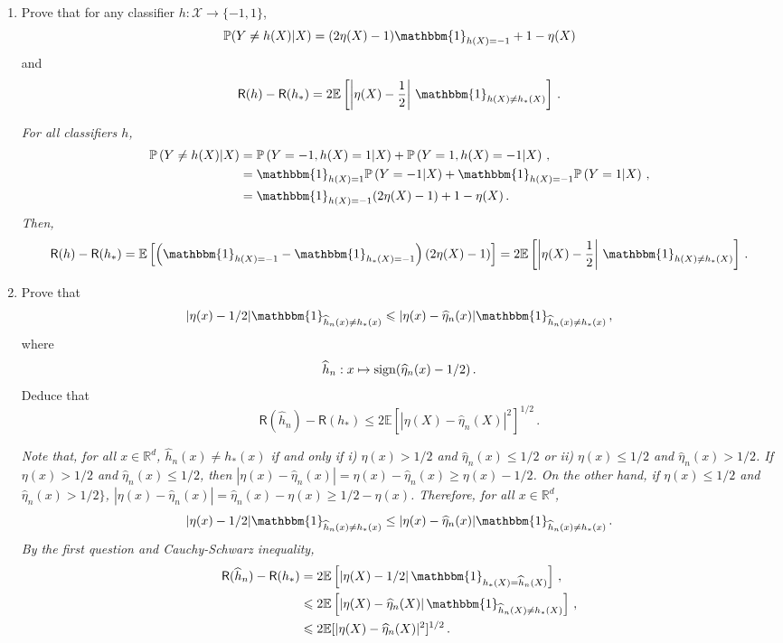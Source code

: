 \documentclass[a4paper,10pt,fleqn]{article}
\newcommand{\eqsp}{\,}
\newcommand{\bP}{\mathbb{P}}
\newcommand{\1}{\ensuremath{\mathbbm{1}}}
\newcommand{\bE}{\mathbb{E}}
\begin{document}
\begin{enumerate}
\item Prove that for any classifier $h:\mathcal{X}\to \{-1,1\}$,
$$
\bP(Y\neq h(X)|X) = (2\eta(X)-1)\1_{h(X)=-1}+1-\eta(X)
$$
and
$$
\mathsf{R}(h)-\mathsf{R}(h_{*})=2\bE \left[\left|\eta(X)-\frac{1}{2}\right|\eqsp\1_{h(X)\neq h_*(X)}\right]\eqsp.
$$

\vspace{.2cm}

{\em
For all classifiers $h$,
\begin{align*}
\bP\left(Y \neq h(X) | X\right)& = \bP\left(Y=-1, h(X) = 1 |X\right) + \bP\left(Y=1, h(X) = -1 |X\right)\eqsp,\\
& = \1_{h(X) = 1} \bP\left(Y=-1 |X\right) + \1_{h(X) = -1} \bP\left(Y=1 |X\right)\eqsp,\\
& = \1_{h(X) = -1} (2\eta(X) - 1) + 1 - \eta(X)\eqsp.
\end{align*}
Then,
$$
\mathsf{R}(h)-\mathsf{R}(h_{*})=\bE \left[\left(\1_{h(X) = -1}-\1_{h_*(X) = -1}\right) (2\eta(X) - 1) \right] =  2\bE \left[\left|\eta(X)-\frac{1}{2}\right|\eqsp\1_{h(X)\neq h_*(X)}\right]\eqsp.
$$
}
\item Prove that 
$$
|\eta(x)-1/2|\1_{\widehat h_n(x)\neq h_{*}(x)}\leqslant |\eta(x)-\widehat \eta_n(x)|\1_{\widehat h_n(x)\neq h_{*}(x)}\eqsp,
$$
where
$$
\widehat h_n:x \mapsto{\rm sign}(\widehat \eta_n(x)-1/2)\eqsp.
$$
Deduce that 
$$
\mathsf{R}(\widehat h_n)-\mathsf{R}(h_*)\leqslant  2 \bE[|\eta(X) - \widehat \eta_n(X)|^2]^{1/2}\eqsp.
$$

\vspace{.2cm}

{\em
Note that, for all $x\in\mathbb{R}^d$, $\widehat h_n(x) \neq h_*(x)$ if and only if i) $\eta(x) > 1/2$ and $\widehat\eta_n(x) \leqslant 1/2$ or ii) $ \eta(x) \leqslant 1/2$ and $\widehat \eta_n(x) > 1/2$. If $\eta(x) > 1/2$ and $\widehat\eta_n(x) \leqslant 1/2$, then $|\eta(x) - \widehat\eta_n(x)| = \eta(x) - \widehat\eta_n(x) \geqslant \eta(x) -1/2$. On the other hand, if $\eta(x) \leqslant 1/2$ and $\widehat \eta_n(x) > 1/2\}$, $|\eta(x) - \widehat\eta_n(x)| = \widehat\eta_n(x) - \eta(x) \geqslant 1/2 - \eta(x)$. 
Therefore, for all $x\in\mathbb{R}^d$,
$$
|\eta(x) - 1/2| \1_{\widehat h_n(x) \neq h_*(x)}\leq |\eta(x) - \widehat \eta_n(x)| \1_{\widehat h_n(x) \neq h_*(x)}\eqsp.
$$
By the first question and Cauchy-Schwarz inequality, 
\begin{align*}
\mathsf{R}(\widehat h_n) - \mathsf{R}(h_*) & = 2  \bE \left[ \left| \eta(X) - 1/2 \right| \1_{h_*(X) = \widehat h_n(X)}  \right]\eqsp,\\
& \leqslant 2 \bE \left[ \left|\eta(X) - \widehat \eta_n(X) \right| \1_{\widehat h_n(X) \neq h_*(X)}  \right]\eqsp,\\
& \leqslant 2 \bE[|\eta(X) - \widehat \eta_n(X)|^2]^{1/2}\eqsp.
\end{align*}
}
\end{enumerate}
\end{document}
